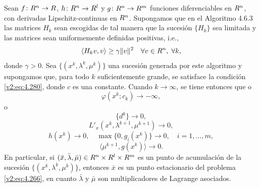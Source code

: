 \begin{theorem}\label{v2:thm:4.6.3}
    Sean $f \colon R^n \to R$, $h \colon R^n \to R^l$ y $g \colon R^n \to R^m$ funciones diferenciables en $R^n$, con derivadas Lipschitz-continuas en $R^n$.
    Supongamos que en el Algoritmo 4.6.3 las matrices $H_k$ sean escogidas de tal manera que la sucesión $\{H_k\}$ sea limitada y las matrices sean uniformemente definidas positivas, i.e.,
    \begin{equation}
        \langle H_k v, v \rangle \ge \gamma \|v\|^2 \quad \forall v \in R^n, \; \forall k,
        \label{v2:eq:4.281}
    \end{equation}
    donde $\gamma > 0$. Sea $\{(x^k, \lambda^k, \mu^k)\}$ una sucesión generada por este algoritmo y supongamos que, para todo $k$ suficientemente grande, se satisface la condición \eqref{v2:eq:4.280}, donde $c$ es una constante.
    Cuando $k \to \infty$, se tiene entonces que o
    \begin{equation}
        \varphi(x^k; c_k) \to -\infty,
        \label{v2:eq:4.282}
    \end{equation}
    o
    \[
        \{d^k\} \to 0,
    \]
    \[
        L'_x(x^k, \lambda^{k+1}, \mu^{k+1}) \to 0,
    \]
    \[
        h(x^k) \to 0, \quad \max\{0, g_i(x^k)\} \to 0, \quad i = 1, \dots, m,
    \]
    \[
        \langle \mu^{k+1}, g(x^k) \rangle \to 0.
    \]
    En particular, si $(\bar{x}, \bar{\lambda}, \bar{\mu}) \in R^n \times R^l \times R^m$ es un punto de acumulación de la sucesión $\{(x^k, \lambda^k, \mu^k)\}$, entonces $\bar{x}$ es un punto estacionario del problema \eqref{v2:eq:4.266}, en cuanto $\bar{\lambda}$ y $\bar{\mu}$ son multiplicadores de Lagrange asociados.
\end{theorem}
